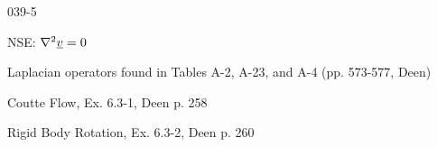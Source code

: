\begin{mitframe}{039-5}

            
\begin{listone}

\item NSE: $\nabla^2\uline{\vvel}=0$

\item Laplacian operators found in Tables A-2, A-23, and A-4 (pp. 573-577, Deen)

\item Coutte Flow, Ex. 6.3-1, Deen p. 258

\item Rigid Body Rotation, Ex. 6.3-2, Deen p. 260
\end{listone}

\end{mitframe}
